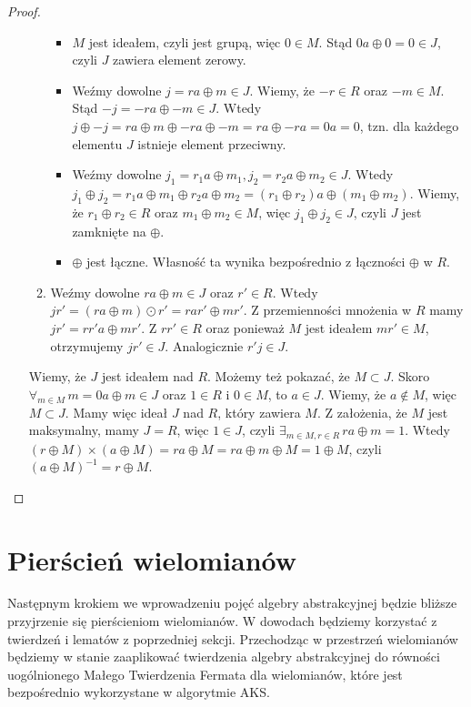 \documentclass[declaration,shortabstract]{iithesis}
\theoremstyle{definition}
\theoremstyle{remark} \newtheorem{observation}{Obserwacja}
\theoremstyle{plain} \newtheorem{theorem}{Twierdzenie}
\theoremstyle{plain} \newtheorem{lemma}{Lemat}
\theoremstyle{remark} \newtheorem*{remark*}{Uwaga}
\theoremstyle{reminder} \newtheorem*{reminder*}{Przypomnienie}
\begin{document}
\begin{proof}
\begin{enumerate}[label=Ad.\arabic*.,leftmargin=.4in]
\begin{enumerate}[label=Ad.2.\arabic*.]
\begin{itemize}
		      	      	\item $M$ jest ideałem, czyli jest grupą, więc $0 \in M$. Stąd $0a \oplus 0 = 0 \in J$, czyli $J$ zawiera element zerowy.
		      	      	\item Weźmy dowolne $j = ra \oplus m \in J$. Wiemy, że $-r \in R$ oraz $-m \in M$. Stąd $-j = -ra \oplus -m \in J$. Wtedy $j \oplus -j = ra \oplus m \oplus -ra \oplus -m = ra \oplus -ra = 0a = 0$, tzn. dla każdego elementu $J$ istnieje element przeciwny.
		      	      	\item Weźmy dowolne $j_1 = r_1a \oplus m_1, j_2 = r_2a \oplus m_2 \in J$. Wtedy $j_1 \oplus j_2 = r_1a \oplus m_1 \oplus r_2a \oplus m_2 = (r_1 \oplus r_2)a \oplus (m_1 \oplus m_2)$. Wiemy, że $r_1 \oplus r_2 \in R$ oraz $m_1 \oplus m_2 \in M$, więc $j_1 \oplus j_2 \in J$, czyli $J$ jest zamknięte na $\oplus$.
		      	      	\item $\oplus$ jest łączne. Własność ta wynika bezpośrednio z łączności $\oplus$ w $R$.
		      	      \end{itemize}
		      	\item Weźmy dowolne $ra \oplus m \in J$ oraz $r' \in R$. Wtedy $jr' = (ra \oplus m) \odot r' = rar' \oplus mr'$. Z przemienności mnożenia w $R$ mamy $jr' = rr'a \oplus mr'$. Z $rr' \in R$ oraz ponieważ $M$ jest ideałem $mr' \in M$, otrzymujemy $jr' \in J$. Analogicznie $r'j \in J$.
		      \end{enumerate}
		      Wiemy, że $J$ jest ideałem nad $R$. Możemy też pokazać, że $M \subset J$. Skoro $\forall_{m \in M} \, m = 0a \oplus m \in J$ oraz $1 \in R$ i $0 \in M$, to $a \in J$. Wiemy, że $a \notin M$, więc $M \subset J$.
		      \newline
		      Mamy więc ideał $J$ nad $R$, który zawiera $M$. Z założenia, że $M$ jest maksymalny, mamy $J = R$, więc $1 \in J$, czyli $\exists_{m \in M, r \in R} \, ra \oplus m = 1$. Wtedy $(r \oplus M) \times (a \oplus M) = ra \oplus M = ra \oplus m \oplus M = 1 \oplus M$, czyli $(a \oplus M)^{-1} = r \oplus M$.
	\end{enumerate}   
	    
\end{proof}

\section{Pierścień wielomianów}

Następnym krokiem we wprowadzeniu pojęć algebry abstrakcyjnej będzie bliższe przyjrzenie się pierścieniom wielomianów. W dowodach będziemy korzystać z twierdzeń i lematów z poprzedniej sekcji. Przechodząc w przestrzeń wielomianów będziemy w stanie zaaplikować twierdzenia algebry abstrakcyjnej do równości uogólnionego Małego Twierdzenia Fermata dla wielomianów, które jest bezpośrednio wykorzystane w algorytmie AKS.
\end{document}
